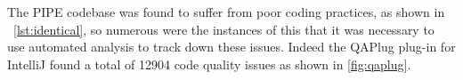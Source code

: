 The PIPE codebase was found to suffer from poor coding practices, as shown in ~\cref{lst:identical}, so numerous were the instances of this that it was necessary to use automated analysis to track down these issues. Indeed the QAPlug plug-in for IntelliJ found a total of \num{12904} code quality issues as shown in \cref{fig:qaplug}.



